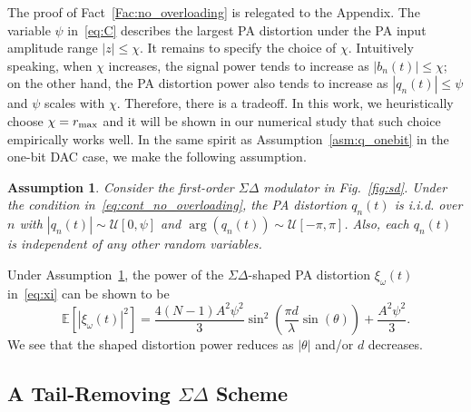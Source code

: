 \documentclass[10pt,twocolumn,twoside]{IEEEtran}
\newtheorem{Asm}{Assumption}
\begin{document}
\noindent
The proof of Fact~\ref{Fac:no_overloading} is relegated to the Appendix.
The variable $\psi$ in~\eqref{eq:C} describes the largest PA distortion under the PA input amplitude range $|z| \le \chi$.
It remains to specify the choice of $\chi$.
Intuitively speaking, when $\chi$ increases, the signal power tends to increase as $|b_n(t)| \le \chi$;
on the other hand, the PA distortion power also tends to increase as $|q_{n}(t)| \le \psi$ and $\psi$ scales with $\chi$.
Therefore, there is a tradeoff.
In this work, we heuristically choose $\chi = r_{\rm max}$ and it will be shown in our numerical study that such choice empirically works well.
In the same spirit as Assumption~\ref{asm:q_onebit} in the one-bit DAC case,
we make the following assumption.
\begin{Asm}\label{asm:q}
	Consider the first-order $\Sigma \Delta$ modulator in Fig.~\ref{fig:sd}.
	Under the condition in~\eqref{eq:cont_no_overloading}, the PA distortion $q_{n}(t)$ is i.i.d. over $n$ with $|q_{n}(t)| \sim \mathcal{U}{[0,\psi]}$ and $\arg(q_{n}(t)) \sim \mathcal{U}{[-\pi,\pi]}$.
	Also, each $q_{n}(t)$ is independent of any other random variables.
\end{Asm}

\noindent
Under Assumption~\ref{asm:q}, the power of the $\Sigma \Delta$-shaped PA distortion $\xi_\omega(t)$ in~\eqref{eq:xi} can be shown to be
\[
\mathbb{E}[|\xi_\omega(t)|^2] =
\frac{4(N-1)A^2\psi^2}{3}   \sin^2 \left( \frac{\pi d}{\lambda} \sin(\theta)\right) + \frac{A^2\psi^2}{3}.
\]
We see that the shaped distortion power reduces as $|\theta|$ and/or $d$ decreases.



\subsection{A Tail-Removing ${\Sigma \Delta}$ Scheme}
\label{sec:sd_tr}
\end{document}
